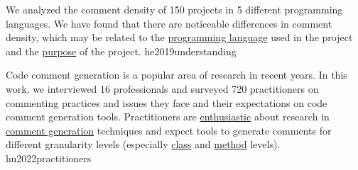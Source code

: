 \documentclass{article}
\begin{document}

  {We analyzed the comment density of 150 projects in 5 different programming languages. We have found that there are noticeable differences in comment density, which may be related to the \ul{programming language} used in the project and the \ul{purpose} of the project.}
  {he2019understanding}


  {Code comment generation is a popular area of research in recent years. In this work, we interviewed 16 professionals and surveyed 720 practitioners on commenting practices and issues they face and their expectations on code comment generation tools. Practitioners are \ul{enthusiastic} about research in \ul{comment generation} techniques and expect tools to generate comments for different granularity levels (especially \ul{class} and \ul{method} levels).}
  {hu2022practitioners}
\end{document}
